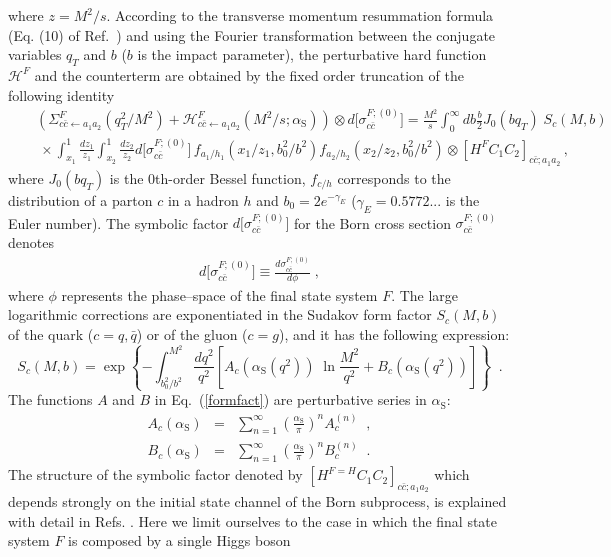 \documentclass[12pt]{article}
\def\beeq{\begin{eqnarray}}
\def\eeeq{\end{eqnarray}}
\def\nn{\nonumber}
\newcommand\as{\alpha_{\mathrm{S}}}
\newcommand\f[2]{\frac{#1}{#2}}
\def\qt{q_T}
\begin{document}
where $z=M^{2}/s$. According to the transverse momentum resummation formula (Eq. (10) of Ref.~\cite{Bozzi:2005wk}) and using the Fourier transformation between the conjugate variables $q_T$ and $b$ ($b$ is the impact parameter), the perturbative hard function $\mathcal{H}^{F}$ and the counterterm are obtained by the fixed order truncation of the following identity
\beeq
\label{reslean}
&&\!\!\!\!\!\!\!\!\!\!\!\!\!\!\!\left( \Sigma^{F}_{c\bar{c}\leftarrow a_{1}a_{2}}(\qt^{2}/M^{2}) + \mathcal{H}^{F}_{c\bar{c}\leftarrow a_{1}a_{2}}(M^{2}/s;\as) \right) \otimes d\big[\sigma^{F;(0)}_{c\bar{c}}\big] =\f{M^{2}}{s}
\int_0^\infty db \f{b}{2} J_0(bq_T)\;S_c(M,b)\\
&&\!\!\!\!\!\!\!\ \times  \int_{x_{1}}^1 \f{dz_1}{z_{1}} \int_{x_{2}}^1  \f{dz_2}{z_{2}} d\big[\sigma^{F;(0)}_{c\bar{c}}\big] \,
 f_{a_{1}/h_1}\left(x_{1}/z_1,b_0^2/b^2\right)f_{a_{2}/h_2}\left(x_{2}/z_2,b_0^2/b^2\right)\otimes\left[ H^{F} C_1 C_2 \right]_{c\bar{c};a_{1}a_{2}}\,, \nn
\eeeq
where $J_0(b q_T)$ is the $0$th-order Bessel function, $f_{c/h}$ corresponds to the distribution of a parton $c$ in a hadron $h$ and $b_0=2 e^{-\gamma_E}$ ($\gamma_E=0.5772...$  is the Euler number). The symbolic factor $d\big[\sigma^{F;(0)}_{c\bar{c}}\big]$ for the Born cross section $\sigma^{F;(0)}_{c\bar{c}}$ denotes
\beeq
d\big[\sigma^{F;(0)}_{c\bar{c}}\big] \equiv \f{d\sigma^{F;(0)}_{c\bar{c}}}{d\phi}\;,
\eeeq 
where $\phi$ represents the phase--space of the final state system $F$. The large logarithmic corrections are exponentiated in the Sudakov form factor $S_c(M,b)$ of the quark  ($c=q, {\bar q}$) or of the gluon ($c=g$), and it has the following  expression:
\begin{equation}
\label{formfact}
S_c(M,b) = \exp \left\{ - \int_{b_0^2/b^2}^{M^2} \frac{dq^2}{q^2} 
\left[ A_c(\as(q^2)) \;\ln \frac{M^2}{q^2} + B_c(\as(q^2)) \right] \right\} 
\;\;. 
\end{equation}
The functions $A$ and $B$  in Eq.~(\ref{formfact}) are perturbative series in $\as$:
\beeq
\label{aexp}
A_c(\as) &=& \sum_{n=1}^\infty \left( \frac{\as}{\pi} \right)^n A_c^{(n)} 
\;\;, \\
\label{bexp}
B_c(\as) &= &\sum_{n=1}^\infty \left( \frac{\as}{\pi} \right)^n B_c^{(n)}
\;\;.
\eeeq
The structure of the symbolic factor denoted by $\left[ H^{F=H} C_1 C_2 \right]_{c\bar{c};a_{1} a_{2}}$ which depends strongly on the initial state channel of the Born subprocess, is explained with detail in Refs. \cite{Catani:2010pd,Catani:2013tia}. Here we limit ourselves to the case in which the final state system $F$ is composed by a single Higgs boson
\end{document}
